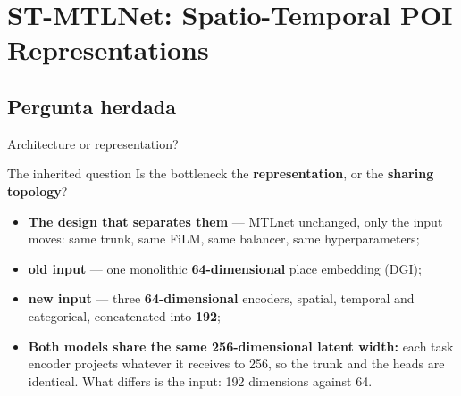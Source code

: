 \documentclass{beamer}
\begin{document}
\section[ST-MTLNet]{ST-MTLNet: Spatio-Temporal POI Representations}


\subsection{Pergunta herdada}

\begin{frame}{Architecture or representation?}
    \begin{alertblock}{The inherited question}
        \centering Is the bottleneck the \textbf{representation}, or the \textbf{sharing topology}?
    \end{alertblock}

    \medskip
    \begin{itemize}\setlength{\itemsep}{4pt}
        \item \textbf{The design that separates them} --- MTLnet unchanged, \alert{only the input
              moves}: same trunk, same FiLM, same balancer, same hyperparameters;
        \item \textbf{old input} --- one monolithic \textbf{64-dimensional} place embedding (DGI);
        \item \textbf{new input} --- three \textbf{64-dimensional} encoders, spatial, temporal and
              categorical, concatenated into \textbf{192};
        \item \textbf{Both models share the same 256-dimensional latent width:} each task encoder
              projects whatever it receives to 256, so the trunk and the heads are identical.
              \alert{What differs is the input: 192 dimensions against 64.}
    \end{itemize}

\end{frame}
\end{document}
